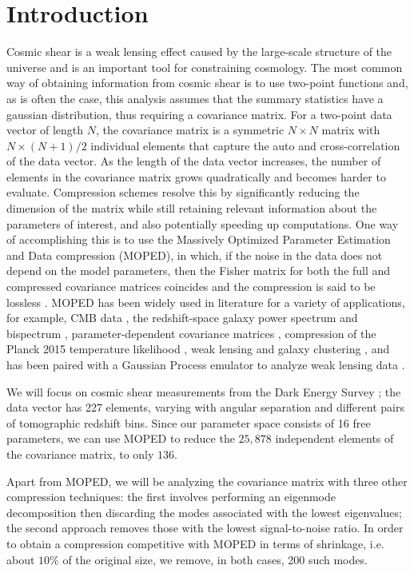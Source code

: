 \documentclass[aps, prd, twocolumn, superscriptaddress, nofootinbib, amssymb, amsmath]{revtex4-2}
\begin{document}
\section{Introduction}
\label{sec:introduction}
Cosmic shear is a weak lensing effect caused by the large-scale structure of the universe and is an important tool for constraining cosmology. The most common way of obtaining information from cosmic shear is to use two-point functions and, as is often the case, this analysis assumes that the summary statistics have a gaussian distribution, thus requiring a covariance matrix. For a two-point data vector of length $N$, the covariance matrix is a symmetric $N\times N$ matrix with $N\times (N+1)/2$ individual elements that capture the auto and cross-correlation of the data vector. As the length of the data vector increases, the number of elements in the covariance matrix grows quadratically and becomes harder to evaluate. Compression schemes resolve this by significantly reducing the dimension of the matrix while still retaining relevant information about the parameters of interest, and also potentially speeding up computations. One way of accomplishing this is to use the Massively Optimized Parameter Estimation and Data compression (MOPED), in which, if the noise in the data does not depend on the model parameters, then the Fisher matrix for both the full and compressed covariance matrices coincides and the compression is said to be lossless \cite{Heavens:2000hjl, Tegmark:1997maa}. MOPED has been widely used in literature for a variety of applications, for example, CMB data \cite{Zablocki:2015zcm}, the redshift-space galaxy power spectrum and bispectrum \cite{Gualdi:2018mjl}, parameter-dependent covariance matrices \cite{Heavens:2017smv}, compression of the Planck 2015 temperature likelihood \cite{Heather:2019d}, weak lensing and galaxy clustering \cite{Ruggeri:2020rb}, and has been paired with a Gaussian Process emulator to analyze weak lensing data \cite{Mootoovaloo:2020}.

We will focus on cosmic shear measurements from the Dark Energy Survey ; the data vector has 227 elements, varying with angular separation and different pairs of tomographic redshift bins. Since our parameter space consists of 16 free parameters, we can use MOPED to reduce the $25,878$ independent elements of the covariance matrix, to only $136$.

Apart from MOPED, we will be analyzing the covariance matrix with three other compression techniques: the first involves performing an eigenmode decomposition then discarding the modes associated with the lowest eigenvalues; the second approach removes those with the lowest signal-to-noise ratio. In order to obtain a compression competitive with MOPED in terms of shrinkage, i.e. about $10\%$ of the original size, we remove, in both cases, 200 such modes.
\end{document}

